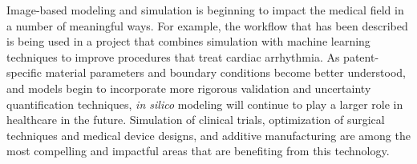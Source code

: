 Image-based modeling and simulation is beginning to impact the medical field in a number of meaningful ways. For example, the workflow that has been described is being used in a project that combines simulation with machine learning techniques to improve procedures that treat cardiac arrhythmia. As patent-specific material parameters and boundary conditions become better understood, and models begin to incorporate more rigorous validation and uncertainty quantification techniques, \textit{in silico} modeling will continue to play a larger role in healthcare in the future. Simulation of clinical trials, optimization of surgical techniques and medical device designs, and additive manufacturing are among the most compelling and impactful areas that are benefiting from this technology.